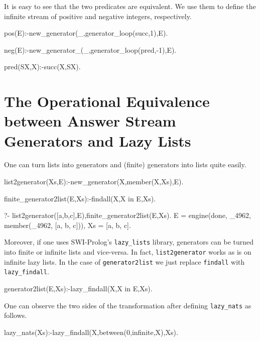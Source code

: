 \documentclass{new_tlp}
\begin{document}
It is easy to see that the two predicates are equivalent. We use
them to define the infinite stream of positive and negative 
integers, respectively.
\begin{code}
pos(E):-new_generator(_,generator_loop(succ,1),E).

neg(E):-new_generator_(_,generator_loop(pred,-1),E).

pred(SX,X):-succ(X,SX).
\end{code}


\section{The Operational Equivalence between Answer Stream Generators and Lazy Lists}

One can turn lists into generators and (finite) generators into lists quite easily.
\begin{code}
list2generator(Xs,E):-new_generator(X,member(X,Xs),E).

finite_generator2list(E,Xs):-findall(X,X in E,Xs).
\end{code}

\BX
\begin{codex}
?- list2generator([a,b,c],E),finite_generator2list(E,Xs).
E = engine(done, _4962, member(_4962, [a, b, c])),
Xs = [a, b, c].
\end{codex}
\EX

Moreover, if one uses SWI-Prolog's {\tt lazy\_lists} library, generators can be turned into finite or infinite lists and vice-versa.
In fact, {\tt list2generator} works as is on infinite lazy lists. In the case of {\tt generator2list} we just replace {\tt findall} with {\tt lazy\_findall}.
\begin{code}
generator2list(E,Xs):-lazy_findall(X,X in E,Xs).
\end{code} 

One can observe the two sides of the transformation after defining {\tt lazy\_nats} as follows.
\begin{code}
lazy_nats(Xs):-lazy_findall(X,between(0,infinite,X),Xs).
\end{code}
\end{document}
